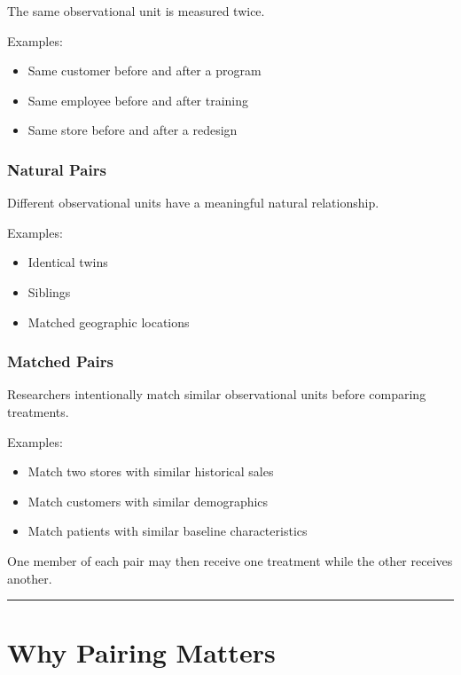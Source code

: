 \documentclass[
  letterpaper,
  DIV=11,
  numbers=noendperiod]{scrreprt}
\providecommand{\tightlist}{%
  \setlength{\itemsep}{0pt}\setlength{\parskip}{0pt}}
\begin{document}
The same observational unit is measured twice.

Examples:

\begin{itemize}
\tightlist
\item
  Same customer before and after a program
\item
  Same employee before and after training
\item
  Same store before and after a redesign
\end{itemize}

\subsection{Natural Pairs}\label{natural-pairs}

Different observational units have a meaningful natural relationship.

Examples:

\begin{itemize}
\tightlist
\item
  Identical twins
\item
  Siblings
\item
  Matched geographic locations
\end{itemize}

\subsection{Matched Pairs}\label{matched-pairs}

Researchers intentionally match similar observational units before
comparing treatments.

Examples:

\begin{itemize}
\tightlist
\item
  Match two stores with similar historical sales
\item
  Match customers with similar demographics
\item
  Match patients with similar baseline characteristics
\end{itemize}

One member of each pair may then receive one treatment while the other
receives another.

\begin{center}\rule{0.5\linewidth}{0.5pt}\end{center}


\chapter{Why Pairing Matters}\label{why-pairing-matters}
\end{document}

